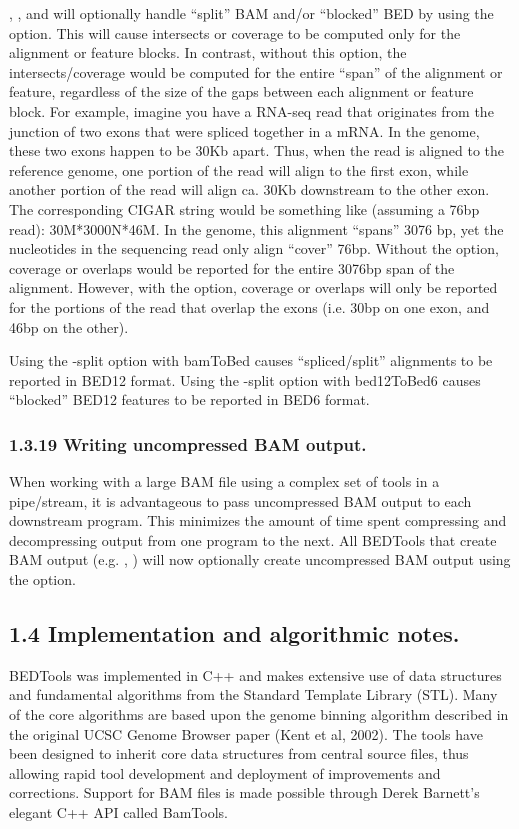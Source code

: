 \documentclass[letterpaper,10pt,english]{sphinxmanual}
\begin{document}
, , and  will optionally handle “split” BAM and/or
“blocked” BED by using the  option. This will cause intersects or coverage to be computed only
for the alignment or feature blocks. In contrast, without this option, the intersects/coverage would be
computed for the entire “span” of the alignment or feature, regardless of the size of the gaps between
each alignment or feature block. For example, imagine you have a RNA-seq read that originates from
the junction of two exons that were spliced together in a mRNA. In the genome, these two exons
happen to be 30Kb apart. Thus, when the read is aligned to the reference genome, one portion of the
read will align to the first exon, while another portion of the read will align ca. 30Kb downstream to the
other exon. The corresponding CIGAR string would be something like (assuming a 76bp read):
30M*3000N*46M. In the genome, this alignment “spans” 3076 bp, yet the nucleotides in the sequencing
read only align “cover” 76bp. Without the  option, coverage or overlaps would be reported for the
entire 3076bp span of the alignment. However, with the  option, coverage or overlaps will only
be reported for the portions of the read that overlap the exons (i.e. 30bp on one exon, and
46bp on the other).

Using the -split option with bamToBed causes “spliced/split” alignments to be reported in BED12
format. Using the -split option with bed12ToBed6 causes “blocked” BED12 features to be reported in
BED6 format.


\subsubsection{1.3.19 Writing uncompressed BAM output.}
\label{content/overview:writing-uncompressed-bam-output}
When working with a large BAM file using a complex set of tools in a pipe/stream, it is advantageous
to pass uncompressed BAM output to each downstream program. This minimizes the amount of time
spent compressing and decompressing output from one program to the next. All BEDTools that create
BAM output (e.g. , ) will now optionally create uncompressed BAM output
using the  option.


\subsection{1.4 Implementation and algorithmic notes.}
\label{content/overview:implementation-and-algorithmic-notes}
BEDTools was implemented in C++ and makes extensive use of data structures and fundamental
algorithms from the Standard Template Library (STL). Many of the core algorithms are based upon the
genome binning algorithm described in the original UCSC Genome Browser paper (Kent et al, 2002).
The tools have been designed to inherit core data structures from central source files, thus allowing
rapid tool development and deployment of improvements and corrections. Support for BAM files is
made possible through Derek Barnett’s elegant C++ API called BamTools.
\end{document}
